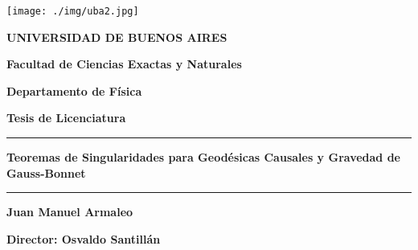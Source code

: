 ﻿\thispagestyle{empty}


\begin {center}


\texttt{[image: ./img/uba2.jpg]}
\medskip

\vspace{.5cm}

\textbf{UNIVERSIDAD DE BUENOS AIRES}



\smallskip

\textbf{Facultad de Ciencias Exactas y Naturales}


\smallskip

\textbf{Departamento de Física}



\vspace{1.5cm}



\textbf{\large Tesis de Licenciatura}



\vspace{0.5cm}


\rule{150mm}{0.5mm}


\vspace{0.5cm}




\textbf{\LARGE Teoremas de Singularidades para Geodésicas Causales y Gravedad de Gauss-Bonnet \\ }



\vspace{0.5cm}


\rule{150mm}{0.5mm}


\vspace{0.5cm}




\textbf{\large Juan Manuel Armaleo}



\end {center}




\vspace{1cm}





\noindent\textbf{Director: Osvaldo Santillán} 




\vspace{2.5cm}





